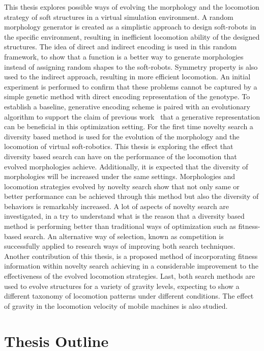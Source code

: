 This thesis explores possible ways of evolving the morphology and the locomotion strategy of soft structures in a virtual simulation environment. A random morphology generator is created as a simplistic approach to design soft-robots in the specific environment, resulting in inefficient locomotion ability of the designed structures. The idea of direct and indirect encoding is used in this random framework, to show that a function is a better way to generate morphologies instead of assigning random shapes to the soft-robots. Symmetry property is also used to the indirect approach, resulting in more efficient locomotion. An initial experiment is performed to confirm that these problems cannot be captured by a simple genetic method with direct encoding representation of the genotype. To establish a baseline, generative encoding scheme is paired with an evolutionary algorithm to support the claim of previous work~\citep{cheney2013unshackling} that a generative representation can be beneficial in this optimization setting. For the first time novelty search a diversity based method is used for the evolution of the morphology and the locomotion of virtual soft-robotics. This thesis is exploring the effect that diversity based search can have on the performance of the locomotion that evolved morphologies achieve. Additionally, it is expected that the diversity of morphologies will be increased under the same settings. Morphologies and locomotion strategies evolved by novelty search show that not only same or better performance can be achieved through this method but also the diversity of behaviors is remarkably increased. A lot of aspects of novelty search are investigated, in a try to understand what is the reason that a diversity based method is performing better than traditional ways of optimization such as fitness-based search. An alternative way of selection, known as competition is successfully applied to research ways of improving both search techniques. Another contribution of this thesis, is a proposed method of incorporating fitness information within novelty search achieving in a considerable improvement to the effectiveness of the evolved locomotion strategies. Last, both search methods are used to evolve structures for a variety of gravity levels, expecting to show a different taxonomy of locomotion patterns under different conditions. The effect of gravity in the locomotion velocity of mobile machines is also studied.


\section{Thesis Outline}

